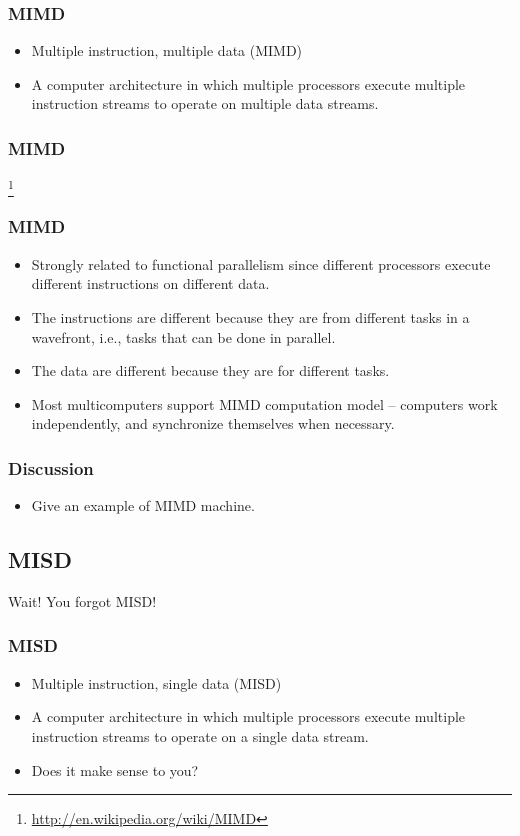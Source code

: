 \documentclass{beamer}
\begin{document}
\begin{CJK}{UTF8}{bsmi}
\begin{frame}
\frametitle{MIMD}
\begin{itemize}
\item Multiple instruction, multiple data (MIMD) 
\item A computer architecture in which multiple processors execute
  multiple instruction streams to operate on multiple data streams.
\end{itemize}
\end{frame}

\begin{frame}
\frametitle{MIMD}
\centerline{}
\footnote{\url{http://en.wikipedia.org/wiki/MIMD}}
\end{frame}

\begin{frame}
\frametitle{MIMD}
\begin{itemize}
\item Strongly related to functional parallelism since different
  processors execute different instructions on different data.
\item The instructions are different because they are from different
  tasks in a wavefront, i.e., tasks that can be done in parallel.
\item The data are different because they are for different tasks.
\item Most multicomputers support MIMD computation model -- computers
  work independently, and synchronize themselves when necessary.
\end{itemize}
\end{frame}

\begin{frame}
\frametitle{Discussion}
\begin{itemize}
\item Give an example of MIMD machine.
\end{itemize}
\end{frame}

\subsection{MISD}

\begin{frame}
\huge Wait! You forgot MISD!
\end{frame}

\begin{frame}
\frametitle{MISD}
\begin{itemize}
\item Multiple instruction, single data (MISD) 
\item A computer architecture in which multiple processors execute
  multiple instruction streams to operate on a single data stream.
\item Does it make sense to you?
\end{itemize}
\end{frame}


\end{CJK}
\end{document}
